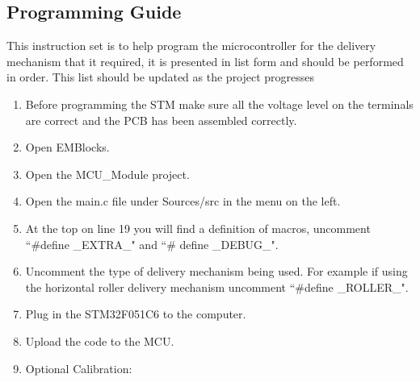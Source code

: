 \documentclass[a4paper,11pt]{article}
\numberwithin{figure}{section}
\numberwithin{table}{section}
\begin{document}
\begin{appendices}
\subsection{Programming Guide}
\label{subsec:progamming}
This instruction set is to help program the microcontroller for the delivery mechanism that it required, it is presented in list form and should be performed in order. This list should be updated as the project progresses
\begin{enumerate}
  \item Before programming the STM make sure all the voltage level on the terminals are correct and the PCB has been assembled correctly.
  \item Open EMBlocks.
  \item Open the MCU\_Module project.
  \item Open the main.c file under Sources/src in the menu on the left.
  \item At the top on line 19 you will find a definition of macros, uncomment ``\#define \_EXTRA\_" and ``\# define \_DEBUG\_".
  \item Uncomment the type of delivery mechanism being used. For example if using the horizontal roller delivery mechanism uncomment ``\#define \_ROLLER\_".
  \item Plug in the STM32F051C6 to the computer.
  \item Upload the code to the MCU.
  \item Optional Calibration: {
  \begin{enumerate}
 

\end{enumerate}}
\end{enumerate}
\end{appendices}
\end{document}
